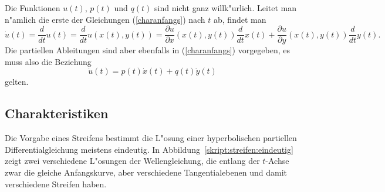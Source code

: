 Die Funktionen $u(t)$, $p(t)$ und $q(t)$ sind nicht ganz willk"urlich.
Leitet man n"amlich die erste der Gleichungen (\ref{charanfangs}) nach
$t$ ab, findet man
\[
\dot{u}(t)=\frac{d}{dt}u(t)
=
\frac{d}{dt}u(x(t),y(t))
=
\frac{\partial u}{\partial x}(x(t), y(t))\frac{d}{dt}x(t)
+
\frac{\partial u}{\partial y}(x(t), y(t))\frac{d}{dt}y(t).
\]
Die partiellen Ableitungen sind aber ebenfalls in (\ref{charanfangs})
vorgegeben, es muss also die Beziehung
\begin{equation}
\dot{u}(t)= p(t)\dot{x}(t) + q(t)\dot{y}(t)
\label{cauchydatarestriction}
\end{equation}
gelten.

\subsection{Charakteristiken}
Die Vorgabe eines Streifens bestimmt die L"osung einer hyperbolischen
partiellen Differentialgleichung meistens eindeutig.
In Abbildung~\ref{skript:streifen:eindeutig} zeigt zwei verschiedene
L"osungen der Wellengleichung, die entlang der $t$-Achse zwar die
gleiche Anfangskurve, aber verschiedene Tangentialebenen und damit
verschiedene Streifen haben.


